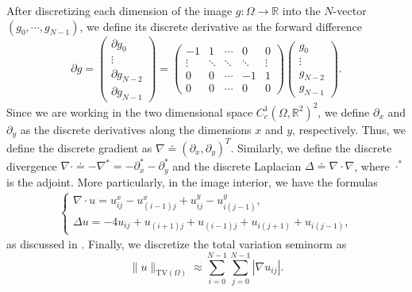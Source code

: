 \documentclass[11pt,reqno,twoside]{amsart}
\theoremstyle{plain}
\theoremstyle{definition}
\numberwithin{figure}{section}
\numberwithin{equation}{section}
\begin{document}
After discretizing each dimension of the image $g: \Omega \to \mathbb{R}$ into the $N$-vector $(g_0, \cdots, g_{N-1})$, we define its discrete derivative as the forward difference
\begin{equation*}
\partial g = \begin{pmatrix} \partial g_0 \\ \vdots \\ \partial g_{N-2} \\ \partial g_{N-1} \end{pmatrix} = \begin{pmatrix} -1 & 1 & \cdots & 0 & 0 \\ \vdots & \ddots & \ddots & \ddots & \vdots \\ 0 & 0 & \cdots & -1 & 1 \\ 0 & 0 & \cdots & 0 & 0 \end{pmatrix}\begin{pmatrix} g_0 \\ \vdots \\ g_{N-2} \\ g_{N-1} \end{pmatrix}.
\end{equation*}
Since we are working in the two dimensional space $C_c^1(\Omega, \mathbb{R}^2)^2$, we define $\partial_x$ and $\partial_y$ as the discrete derivatives along the dimensions $x$ and $y$, respectively.  Thus, we define the discrete gradient as $\nabla \doteq (\partial_x,\partial_y)^T$.  Similarly, we define the discrete divergence $\nabla \cdot \doteq -\nabla^* = -\partial_x^* - \partial_y^*$ and the discrete Laplacian $\Delta \doteq \nabla \cdot \nabla$, where $\cdot^*$ is the adjoint.  More particularly, in the image interior, we have the formulas
\begin{align*}
\begin{cases}
\nabla \cdot u = u_{ij}^x - u_{(i-1)j}^x + u_{ij}^y - u_{i(j-1)}^y, \\ 
\Delta u = -4u_{ij} + u_{(i+1)j} + u_{(i-1)j} + u_{i(j+1)} + u_{i(j-1)},
\end{cases}
\end{align*}
as discussed in \cite{ge2012b}.  Finally, we discretize the total variation seminorm as 
\begin{equation*}
\|u\|_{\text{TV}(\Omega)} \approx \sum_{i=0}^{N-1} \sum_{j=0}^{N-1} |\nabla u_{ij}|.
\end{equation*}
\end{document}

